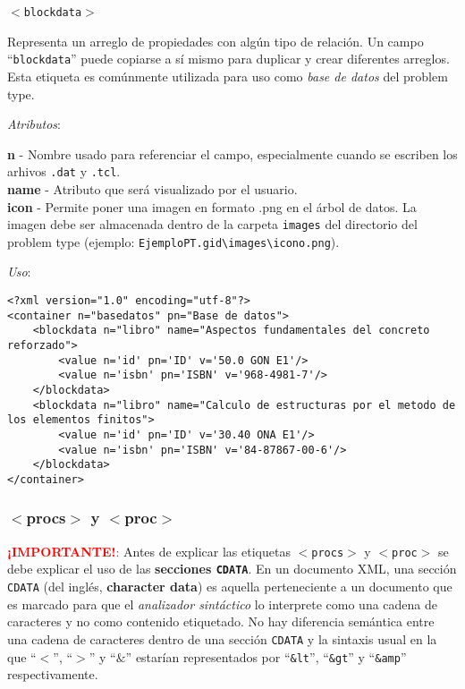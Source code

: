 \documentclass[10pt, a4paper, twocolumn]{article} %
\begin{document}
\vspace{0.20cm}
\begin{center}
	\texttt{$<$blockdata$>$}
\end{center}
\vspace{0.20cm}

Representa un arreglo de propiedades con algún tipo de relación. Un campo ``\texttt{blockdata}'' puede copiarse a sí mismo para duplicar y crear diferentes arreglos. Esta etiqueta es comúnmente utilizada para uso como \textit{base de datos} del problem type.

\vspace{0.15cm}
\textit{Atributos}:

\vspace{0.15cm}
	\textbf{n} - Nombre usado para referenciar el campo, especialmente cuando se escriben los arhivos \texttt{.dat} y \texttt{.tcl}.\\
	\textbf{name} - Atributo que será visualizado por el usuario.\\
	\textbf{icon} - Permite poner una imagen en formato .png en el árbol de datos. La imagen debe ser almacenada dentro de la carpeta \texttt{images} del directorio del problem type (ejemplo: \texttt{EjemploPT.gid\textbackslash images\textbackslash icono.png}).\\
\vspace{0.15cm}

\textit{Uso}:
\vspace{0.15cm}

\lstset{language=XML} 
\begin{lstlisting}
<?xml version="1.0" encoding="utf-8"?>
<container n="basedatos" pn="Base de datos">
	<blockdata n="libro" name="Aspectos fundamentales del concreto reforzado">
		<value n='id' pn='ID' v='50.0 GON E1'/>
		<value n='isbn' pn='ISBN' v='968-4981-7'/>
	</blockdata>
	<blockdata n="libro" name="Calculo de estructuras por el metodo de los elementos finitos">
		<value n='id' pn='ID' v='30.40 ONA E1'/>
		<value n='isbn' pn='ISBN' v='84-87867-00-6'/>
	</blockdata>
</container>
\end{lstlisting}


\subsubsection{$<$procs$>$ y $<$proc$>$}

\textcolor{red}{\textbf{¡IMPORTANTE!}:} Antes de explicar las etiquetas \texttt{$<$procs$>$} y \texttt{$<$proc$>$} se debe explicar el uso de las \textbf{secciones \texttt{CDATA}}. En un documento XML, una sección \texttt{CDATA} (del inglés, \textbf{character data}) es aquella perteneciente a un documento que es marcado para que el \textit{analizador sintáctico} lo interprete como una cadena de caracteres y no como contenido etiquetado. No hay diferencia semántica entre una cadena de caracteres dentro de una sección \texttt{CDATA} y la sintaxis usual en la que ``$<$'', ``$>$'' y ``$\&$'' estarían representados por ``\texttt{\&lt}'', ``\texttt{\&gt}'' y ``\texttt{\&amp}'' respectivamente.
\end{document}
